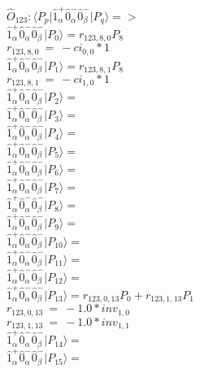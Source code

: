 \documentclass[14pt]{article}
\begin{document}
    $\hat{O}_{123}:  \langle{P_p}\vert \hat{1}_{\alpha}^{+}\hat{0}_{\alpha}^{-}\hat{0}_{\beta}^{-} \vert{P_q}\rangle => $ \\ 
    $ \hat{1}_{\alpha}^{+}\hat{0}_{\alpha}^{-}\hat{0}_{\beta}^{-} \vert{P_{0}}\rangle = {r}_{123,8,0}P_{8} $ \\ 
    ${r}_{123,8,0}\ =\ -{ci}_{0,0}*1 $ \\ 
    $ \hat{1}_{\alpha}^{+}\hat{0}_{\alpha}^{-}\hat{0}_{\beta}^{-} \vert{P_{1}}\rangle = {r}_{123,8,1}P_{8} $ \\ 
    ${r}_{123,8,1}\ =\ -{ci}_{1,0}*1 $ \\ 
    $ \hat{1}_{\alpha}^{+}\hat{0}_{\alpha}^{-}\hat{0}_{\beta}^{-} \vert{P_{2}}\rangle =  $ \\ 
    $ \hat{1}_{\alpha}^{+}\hat{0}_{\alpha}^{-}\hat{0}_{\beta}^{-} \vert{P_{3}}\rangle =  $ \\ 
    $ \hat{1}_{\alpha}^{+}\hat{0}_{\alpha}^{-}\hat{0}_{\beta}^{-} \vert{P_{4}}\rangle =  $ \\ 
    $ \hat{1}_{\alpha}^{+}\hat{0}_{\alpha}^{-}\hat{0}_{\beta}^{-} \vert{P_{5}}\rangle =  $ \\ 
    $ \hat{1}_{\alpha}^{+}\hat{0}_{\alpha}^{-}\hat{0}_{\beta}^{-} \vert{P_{6}}\rangle =  $ \\ 
    $ \hat{1}_{\alpha}^{+}\hat{0}_{\alpha}^{-}\hat{0}_{\beta}^{-} \vert{P_{7}}\rangle =  $ \\ 
    $ \hat{1}_{\alpha}^{+}\hat{0}_{\alpha}^{-}\hat{0}_{\beta}^{-} \vert{P_{8}}\rangle =  $ \\ 
    $ \hat{1}_{\alpha}^{+}\hat{0}_{\alpha}^{-}\hat{0}_{\beta}^{-} \vert{P_{9}}\rangle =  $ \\ 
    $ \hat{1}_{\alpha}^{+}\hat{0}_{\alpha}^{-}\hat{0}_{\beta}^{-} \vert{P_{10}}\rangle =  $ \\ 
    $ \hat{1}_{\alpha}^{+}\hat{0}_{\alpha}^{-}\hat{0}_{\beta}^{-} \vert{P_{11}}\rangle =  $ \\ 
    $ \hat{1}_{\alpha}^{+}\hat{0}_{\alpha}^{-}\hat{0}_{\beta}^{-} \vert{P_{12}}\rangle =  $ \\ 
    $ \hat{1}_{\alpha}^{+}\hat{0}_{\alpha}^{-}\hat{0}_{\beta}^{-} \vert{P_{13}}\rangle = {r}_{123,0,13}P_{0}+{r}_{123,1,13}P_{1} $ \\ 
    ${r}_{123,0,13}\ =\ -1.0*{inv}_{1,0} $ \\ 
    ${r}_{123,1,13}\ =\ -1.0*{inv}_{1,1} $ \\ 
    $ \hat{1}_{\alpha}^{+}\hat{0}_{\alpha}^{-}\hat{0}_{\beta}^{-} \vert{P_{14}}\rangle =  $ \\ 
    $ \hat{1}_{\alpha}^{+}\hat{0}_{\alpha}^{-}\hat{0}_{\beta}^{-} \vert{P_{15}}\rangle =  $ \\ 
    
\end{document}
